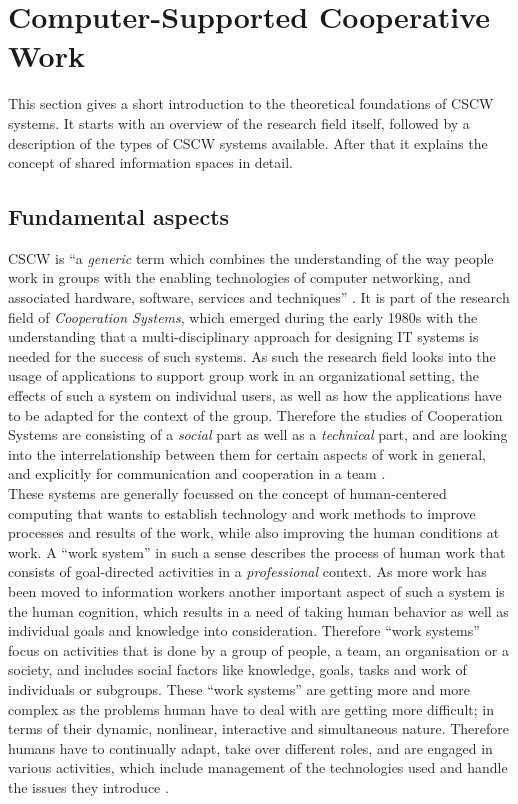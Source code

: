 
\section{Computer-Supported Cooperative Work}
\label{sec:cscw}

This section gives a short introduction to the theoretical foundations of \gls{CSCW} systems. It starts with an overview of the research field itself, followed by a description of the types of \gls{CSCW} systems available. After that it explains the concept of shared information spaces in detail.

\subsection{Fundamental aspects}
\label{sec:cscw_definition}

\gls{CSCW} is ``a \emph{generic} term which combines the understanding of the way people work in groups with the enabling technologies of computer networking, and associated hardware, software, services and techniques'' \citep[pg. 92]{borghoff2000computer}. It is part of the research field of \emph{Cooperation Systems}, which emerged during the early 1980s with the understanding that a multi-disciplinary approach for designing \gls{IT} systems is needed for the success of such systems. As such the research field looks into the usage of applications to support group work in an organizational setting, the effects of such a system on individual users, as well as how the applications have to be adapted for the context of the group. Therefore the studies of Cooperation Systems are consisting of a \emph{social} part as well as a \emph{technical} part, and are looking into the interrelationship between them for certain aspects of work in general, and explicitly for communication and cooperation in a team \citep{Grudin1994}. \\

These systems are generally focussed on the concept of human-centered computing that wants to establish technology and work methods to improve processes and results of the work, while also improving the human conditions at work. A ``work system'' in such a sense describes the process of human work that consists of goal-directed activities in a \emph{professional} context. As more work has been moved to information workers another important aspect of such a system is the human cognition, which results in a need of taking human behavior as well as individual goals and knowledge into consideration. Therefore ``work systems'' focus on activities that is done by a group of people, a team, an organisation or a society, and includes social factors like knowledge, goals, tasks and work of individuals or subgroups. These ``work systems'' are getting more and more complex as the problems human have to deal with are getting more difficult; in terms of their dynamic, nonlinear, interactive and simultaneous nature. Therefore humans have to continually adapt, take over different roles, and are engaged in various activities, which include management of the technologies used and handle the issues they introduce \citep{Hoffmann2009}. \\

